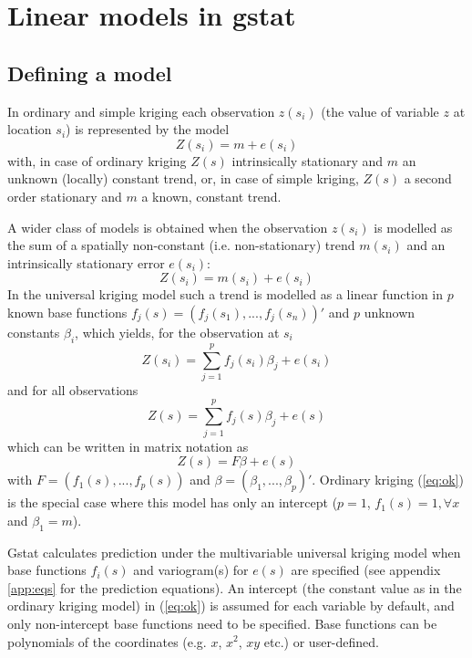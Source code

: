 \documentclass[a4paper,12pt]{book}
\renewcommand{\cite}{\citet}
\begin{document}
\section{Linear models in gstat}
\label{sec:linear}

\subsection*{Defining a model}

In ordinary and simple kriging each observation $z(s_i)$ (the value of
variable $z$ at location $s_i$) is represented by the model
\begin{equation}
Z(s_i) = m + e(s_i)
\label{eq:ok}
\end{equation}
with, in case of ordinary kriging $Z(s)$ intrinsically stationary and
$m$ an unknown (locally) constant trend, or, in case of simple kriging,
$Z(s)$ a second order stationary and $m$ a known, constant trend.

A wider class of models is obtained when the observation $z(s_i)$ is
modelled as the sum of a spatially non-constant (i.e. non-stationary)
trend $m(s_i)$ and an intrinsically stationary error $e(s_i)$:
\begin{equation}
Z(s_i)=m(s_i)+e(s_i)
\label{eq:uk}
\end{equation}
In the universal kriging model such a trend is modelled as a linear
function in $p$ known base functions $f_j (s) = (f_j (s_1),...,f_j(s_n))'$
and $p$ unknown constants $\beta_i$, which yields, for the observation
at $s_i$
$$ Z(s_i)=\sum_{j=1}^{p} f_j (s_i) \beta_j + e(s_i) $$
and for all observations
$$ Z(s)=\sum_{j=1}^{p} f_j(s)\beta_j + e(s)$$
which can be written in matrix notation as
\begin{equation}
Z(s)= F \beta + e(s)
\label{eq:lm}
\end{equation}
with $F = (f_1 (s),...,f_p (s))$ and $\beta = (\beta_1 ,...,
\beta_p)'$. Ordinary kriging (\ref{eq:ok}) is the special case where
this model has only an intercept ($p=1$, $f_1 (s) = 1, \forall x$ and
$\beta_1 = m$).

Gstat calculates prediction under the multivariable universal kriging
model \cite{verhoef93} when base functions $f_i(s)$ and variogram(s) for
$e(s)$ are specified (see appendix \ref{app:eqs} for the prediction
equations). An intercept (the constant value as in the ordinary
kriging model) in (\ref{eq:ok}) is assumed for each variable by default,
and only non-intercept base functions need to be specified. Base
functions can be polynomials of the coordinates (e.g. $x$, $x^2$, $xy$
etc.) or user-defined.
\end{document}
